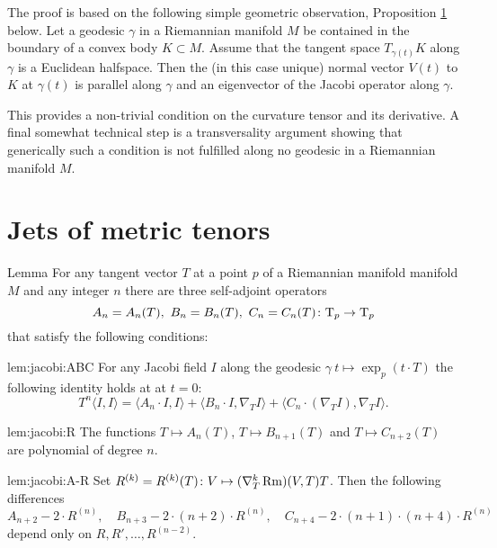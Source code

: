 \documentclass[a4paper,10pt]{article}
\begin{document}
     

 
 The proof is based on the following simple geometric observation, Proposition \ref{} below.
 Let a geodesic $\gamma $ in a Riemannian manifold $M$ be contained in the boundary of a convex 
 body $K\subset M$. Assume  that the tangent space $T_{\gamma (t)}K$ along $\gamma$ is a Euclidean halfspace. Then  the (in this case unique) normal vector $V(t)$ to $K$ at $\gamma (t)$
  is parallel along $\gamma$ and an eigenvector of the Jacobi operator along $\gamma$.
  
  This provides a non-trivial condition on the curvature tensor  and its derivative.  A final somewhat technical step is a transversality argument showing that generically such a condition is not fulfilled along no geodesic in a Riemannian manifold $M$.
  
  
\section{Jets of metric tenors}


\begin{thm}{Lemma}\label{lem:jacobi}
For any tangent vector $T$ at a point $p$ of a Riemannian manifold manifold $M$ and any integer $n$ there are three self-adjoint operators 
\[A_n=A_n(T),\ B_n=B_n(T),\ C_n=C_n(T)\colon\mathrm{T}_p\to \mathrm{T}_p\]
that satisfy the following conditions:

\begin{subthm}{lem:jacobi:ABC}
For any Jacobi field $I$ along the geodesic $\gamma\:t\mapsto \exp_p(t\cdot T)$ the following identity holds at at $t=0$:
\[T^n\langle I,I\rangle
=
\langle A_n\cdot  I,I\rangle+ \langle B_n\cdot I,\nabla_T I\rangle+\langle C_n\cdot (\nabla_T I),\nabla_TI\rangle.\]
\end{subthm}

\begin{subthm}{lem:jacobi:R}
The functions $T\mapsto A_{n}(T)$, $T\mapsto B_{n+1}(T)$ and $T\mapsto C_{n+2}(T)$ are polynomial of degree $n$.
\end{subthm}

\begin{subthm}{lem:jacobi:A-R}
Set $R^{(k)}=R^{(k)}(T)\colon V\mapsto (\nabla^k_T\operatorname{Rm})(V,T)T$. Then the following differences  
\[A_{n+2}-2\cdot R^{(n)},\quad B_{n+3}-2\cdot(n+2)\cdot R^{(n)},\quad C_{n+4}-2\cdot(n+1)\cdot(n+4)\cdot R^{(n)}\]
depend only on $R,R',\dots, R^{(n-2)}$.
\end{subthm}


\end{thm}
\end{document}
